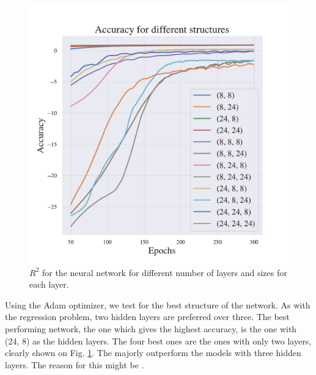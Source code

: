 \begin{figure}[h!]
    \centering
    \includegraphics[width=1.0\linewidth]{project_2/figures/Accuracy for different structures_classification.pdf}
    \caption{$R^2$ for the neural network for different number of layers and sizes for each layer.}
    \label{fig:structure_cancer}
\end{figure}

Using the Adam optimizer, we test for the best structure of the network. As with the regression problem, two hidden layers are preferred over three. 
The best performing network, the one which gives the highest accuracy, is the one with (24, 8) as the hidden layers. The four best ones are the ones with only two layers, clearly shown on Fig. \ref{fig:structure_cancer}. The majorly outperform the models with three hidden layers. 
The reason for this might be \mia{}.

